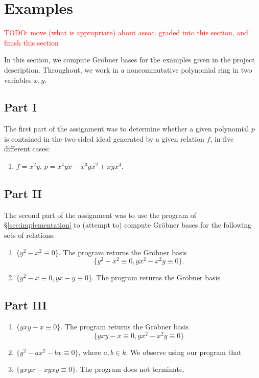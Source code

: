 \section{Examples}\label{sec:examples}
\textcolor{red}{TODO: move (what is appropriate) about assoc. graded into this section, and finish this section}

In this section, we compute Gr\"obner bases for the examples given in the project description. Throughout, we work in a noncommutative polynomial ring in two variables $x,y$.

\subsection*{Part I}

The first part of the assignment was to determine whether a given polynomial $p$ is contained in the two-sided ideal generated by a given relation $f$, in five different cases:

\begin{enumerate}
	\item $f=x^2y$, $p=x^4 y x - x^3 y x^2+ x y x^4$.
\end{enumerate}

\subsection*{Part II}

The second part of the assignment was to use the program of \S\ref{sec:implementation} to (attempt to) compute Gr\"obner bases for the following sets of relations:

\begin{enumerate}
	\item $\{y^2-x^2\equiv 0\}$. The program returns the Gr\"obner basis
	\begin{equation*}
		\{y^2-x^2\equiv 0,yx^2-x^2y\equiv 0\}.
	\end{equation*}
	\item $\{y^2-x\equiv 0,yx-y\equiv 0\}$. The program returns the Gr\"obner basis
\end{enumerate}

\subsection*{Part III}

\begin{enumerate}
	\item $\{yxy-x\equiv 0\}$. The program returns the Gr\"obner basis
	\begin{equation*}
		\{yxy-x\equiv 0,yx^2-x^2y\equiv 0\}
	\end{equation*}
	\item $\{y^2-ax^2-bx\equiv 0\}$, where $a,b\in k$. We observe using our program that
	\item $\{yxyx-xyxy\equiv 0\}$. The program does not terminate.
\end{enumerate}
